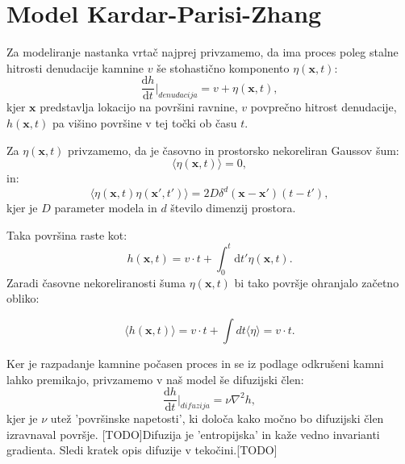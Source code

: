 \documentclass[a4paper, twoside, 12pt]{book}
\begin{document}
    \section{Model Kardar-Parisi-Zhang}

    Za modeliranje nastanka vrtač najprej privzamemo, da ima proces poleg stalne hitrosti denudacije kamnine $v$ še stohastično komponento $\eta(\mathbf{x},t)$:
\begin{equation}
  \frac{\mathrm{d} h}{\mathrm{d} t} \bigg|_{denudacija} = v + \eta(\mathbf{x},t),
\end{equation}
kjer $\mathbf{x}$ predstavlja lokacijo na površini ravnine, $v$ povprečno hitrost denudacije, $h(\mathbf{x},t)$ pa višino površine v tej točki ob času $t$. 

Za $\eta (\mathbf{x},t)$ privzamemo, da je časovno in prostorsko nekoreliran Gaussov šum: 
\begin{equation} 
  \langle \eta(\mathbf{x},t) \rangle=0,
\end{equation}
in:
\begin{equation}
  \langle \eta(\mathbf{x},t) \eta(\mathbf{x'},t')\rangle = 2 D \delta^d(\mathbf{x}-\mathbf{x'})(t-t'),
\end{equation}
kjer je $D$ parameter modela in $d$ število dimenzij prostora.

Taka površina raste kot:
\begin{equation}
  h(\mathbf{x},t) = v \cdot t + \int_0^t \mathrm{d} t' \eta (\mathbf{x},t).
\end{equation}
Zaradi časovne nekoreliranosti šuma $\eta({\mathbf{x},t})$ bi tako površje ohranjalo začetno obliko:

\begin{equation}
  \langle h(\mathbf{x},t) \rangle = v \cdot t + \int dt \langle \eta \rangle = v \cdot t.
\end{equation}

Ker je razpadanje kamnine počasen proces in se iz podlage odkrušeni kamni lahko premikajo, privzamemo v naš model še difuzijski člen:
\begin{equation}
  \frac{\mathrm{d} h}{\mathrm{d} t} \bigg|_{difuzija} = \nu \nabla^2 h,
\end{equation}
kjer je $\nu$ utež 'površinske napetosti', ki določa kako močno bo difuzijski člen izravnaval površje.
[TODO]Difuzija je 'entropijska' in kaže vedno invarianti gradienta. Sledi kratek opis difuzije v tekočini.[TODO]
\end{document}
